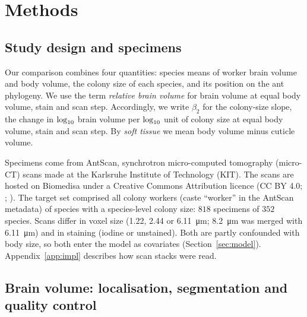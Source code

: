 \documentclass[11pt]{article}
\begin{document}
\section{Methods}\label{sec:methods}

\subsection{Study design and specimens}\label{sec:design}

Our comparison combines four quantities: species means of worker brain volume and body volume, the colony size of
each species, and its position on the ant phylogeny. We use the term \emph{relative brain volume} for brain volume at
equal body volume, stain and scan step. Accordingly, we write $\beta_2$ for the colony-size slope, the change in
$\log_{10}$ brain volume per $\log_{10}$ unit of colony size at equal body volume, stain and scan step. By \emph{soft tissue}
we mean body volume minus cuticle volume.

Specimens come from AntScan, synchrotron micro-computed tomography (micro-CT) scans made at the Karlsruhe Institute of
Technology (KIT). The scans are hosted on Biomedisa under a Creative Commons Attribution licence (CC BY 4.0;
\citealp{katzke2026}; \citealp{losel2020}). The target set comprised all colony workers (caste ``worker'' in the
AntScan metadata) of species with a species-level colony size: $818$ specimens of $352$ species. Scans differ in voxel
size (1.22, 2.44 or \qty{6.11}{\um}; \qty{8.2}{\um} was merged with \qty{6.11}{\um}) and in staining (iodine or
unstained). Both are partly confounded with body size, so both enter the model as covariates
(Section~\ref{sec:model}). Appendix~\ref{app:impl} describes how scan stacks were read.

\subsection{Brain volume: localisation, segmentation and quality control}\label{sec:brain}
\end{document}
